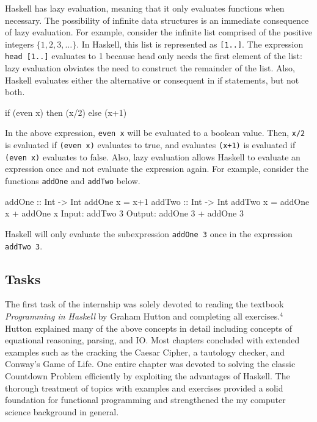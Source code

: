 \documentclass[11pt]{article}
\begin{document}
Haskell has lazy evaluation, meaning that it only evaluates functions when necessary. The possibility of infinite data structures is an immediate consequence of lazy evaluation. For example, consider the infinite list comprised of the positive integers $\{1,2,3,\ldots\}$. In Haskell, this list is represented as \texttt{[1..]}. The expression \texttt{head [1..]} evaluates to 1 because head only needs the first element of the list: lazy evaluation obviates the need to construct the remainder of the list. Also, Haskell evaluates either the alternative or consequent in if statements, but not both. 

\hspace{2cm}\begin{verbbox}
if (even x) then (x/2) else (x+1)
\end{verbbox}
\theverbbox

In the above expression, \texttt{even x} will be evaluated to a boolean value. Then, \texttt{x/2} is evaluated if \texttt{(even x)} evaluates to true, and evaluates \texttt{(x+1)} is evaluated if \texttt{(even x)} evaluates to false. Also, lazy evaluation allows Haskell to evaluate an expression once and not evaluate the expression again. For example, consider the functions \texttt{addOne} and \texttt{addTwo} below.

\hspace{2cm}\begin{verbbox}
addOne :: Int -> Int
addOne x = x+1
addTwo :: Int -> Int
addTwo x = addOne x + addOne x                                                                                                                              
Input:  addTwo 3
Output: addOne 3 + addOne 3                
\end{verbbox}
\theverbbox
                  
Haskell will only evaluate the subexpression \texttt{addOne 3} once in the expression \texttt{addTwo 3}.
                                                           
\subsection{Tasks}

The first task of the internship was solely devoted to reading the textbook \textit{Programming in Haskell} by Graham Hutton and completing all exercises.$^4$ Hutton explained many of the above concepts in detail including concepts of equational reasoning, parsing, and IO. Most chapters concluded with extended examples such as the cracking the Caesar Cipher, a tautology checker, and Conway's Game of Life. One entire chapter was devoted to solving the classic Countdown Problem efficiently by exploiting the advantages of Haskell. The thorough treatment of topics with examples and exercises provided a solid foundation for functional programming and strengthened the my computer science background in general. 
\end{document}
